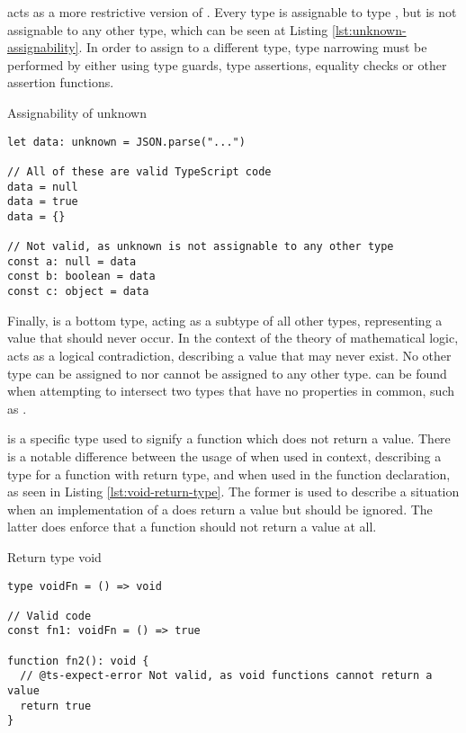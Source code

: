  acts as a more restrictive version of . Every type is assignable to type , but  is not assignable to any other type, which can be seen at Listing \ref{lst:unknown-assignability}. In order to assign  to a different type, type narrowing must be performed by either using type guards, type assertions, equality checks or other assertion functions.

\begin{listing}[ht]
  \caption{Assignability of unknown}\label{lst:unknown-assignability}
  \begin{verbatim}
let data: unknown = JSON.parse("...") 

// All of these are valid TypeScript code
data = null
data = true
data = {}

// Not valid, as unknown is not assignable to any other type
const a: null = data
const b: boolean = data
const c: object = data
  \end{verbatim}
\end{listing}

Finally,  is a bottom type, acting as a subtype of all other types, representing a value that should never occur. In the context of the theory of mathematical logic,  acts as a logical contradiction, describing a value that may never exist. No other type can be assigned to  nor  cannot be assigned to any other type.  can be found when attempting to intersect two types that have no properties in common, such as .

 is a specific type used to signify a function which does not return a value. There is a notable difference between the usage of  when used in context, describing a type for a function with  return type, and when used in the function declaration, as seen in Listing \ref{lst:void-return-type}. The former is used to describe a situation when an implementation of a  does return a value but should be ignored. The latter does enforce that a function should not return a value at all.

\begin{listing}[ht]
  \caption{Return type void}\label{lst:void-return-type}
  \begin{verbatim}
type voidFn = () => void

// Valid code
const fn1: voidFn = () => true

function fn2(): void {
  // @ts-expect-error Not valid, as void functions cannot return a value
  return true
}
\end{verbatim}
\end{listing}

